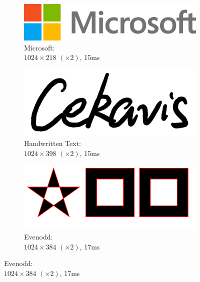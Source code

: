 \documentclass[UTF8]{ctexart}
\begin{document}
\begin{figure}[H]
\begin{subfigure}[b]{0.4\textwidth}
    \end{subfigure}
    \par\bigskip
    \begin{subfigure}[b]{0.4\textwidth}
        \centering
        \includegraphics[width=\textwidth]{images/Microsoft-1024x218-x2-15ms.png}
        \caption{Microsoft: \\$1024 \times 218$ $(\times 2)$, 15ms}
    \end{subfigure}
    \hfill
    \begin{subfigure}[b]{0.4\textwidth}
        \centering
        \includegraphics[width=\textwidth]{images/Handwritten Text-1024x398-x2-15ms.png}
        \caption{Handwritten Text: \\$1024 \times 398$ $(\times 2)$, 15ms}
    \end{subfigure}
    \par\bigskip
    \begin{subfigure}[b]{0.4\textwidth}
        \centering
        \includegraphics[width=\textwidth]{images/Evenodd-1024x384-x2-17ms.png}
        \caption{Evenodd: \\$1024 \times 384$ $(\times 2)$, 17ms}
    \end{subfigure}
    \hfill

\end{figure}
\end{document}
